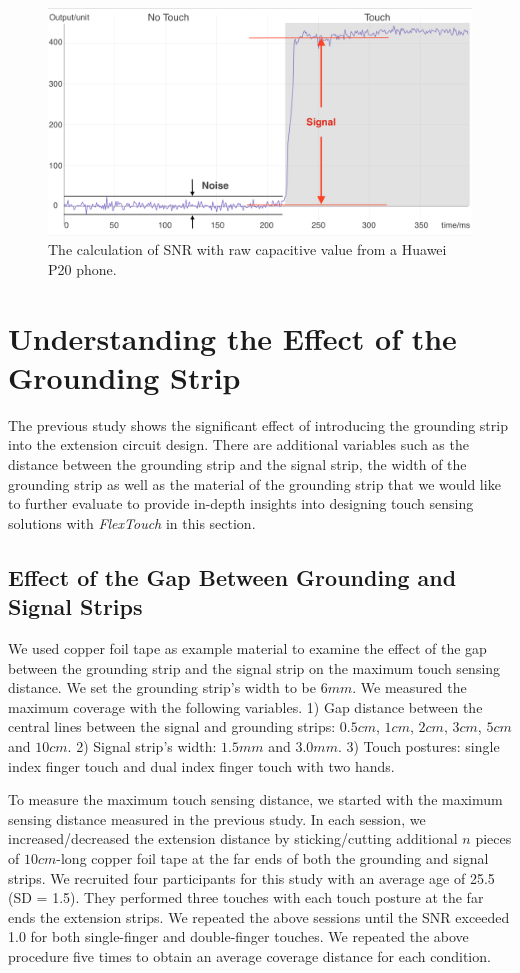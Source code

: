 	\begin{figure}
	\centering
	  \includegraphics[width=0.95\columnwidth]{figures/SNR-definition.png}
	  \caption{The calculation of SNR with raw capacitive value from a Huawei P20 phone.}
	  \label{fig:SNR}
	\end{figure}

\section{Understanding the Effect of the Grounding Strip}
The previous study shows the significant effect of introducing the grounding strip into the extension circuit design. There are additional variables such as the distance between the grounding strip and the signal strip, the width of the grounding strip as well as the material of the grounding strip that we would like to further evaluate to provide in-depth insights into designing touch sensing solutions with \textit{FlexTouch} in this section.

\subsection{Effect of the Gap Between Grounding and Signal Strips}

We used copper foil tape as example material to examine the effect of the gap between the grounding strip and the signal strip on the maximum touch sensing distance. We set the grounding strip's width to be $6 mm$. We measured the maximum coverage with the following variables. 1) Gap distance between the central lines between the signal and grounding strips: $0.5 cm$,  $1 cm$, $2 cm$, $3 cm$, $5 cm$ and $10 cm$. 2) Signal strip's width: $1.5 mm$ and $3.0 mm$. 3) Touch postures: single index finger touch and dual index finger touch with two hands.

To measure the maximum touch sensing distance, we started with the maximum sensing distance measured in the previous study. In each session, we increased/decreased the extension distance by sticking/cutting additional $n$ pieces of $10 cm$-long copper foil tape at the far ends of both the grounding and signal strips. We recruited four participants for this study with an average age of 25.5 (SD = 1.5). They performed three touches with each touch posture at the far ends the extension strips. We repeated the above sessions until the SNR exceeded 1.0 for both single-finger and double-finger touches. We repeated the above procedure five times to obtain an average coverage distance for each condition. 

